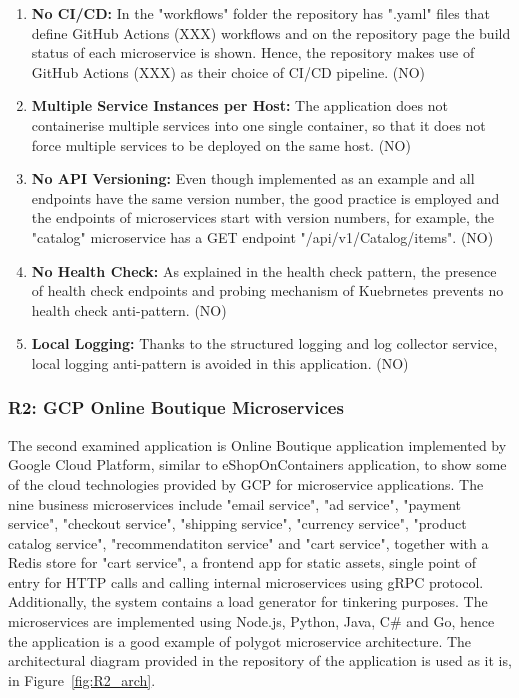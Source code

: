 \documentclass{Configuration_Files/PoliMi3i_thesis}
\begin{document}
\begin{enumerate}
    \item \textbf{No CI/CD:} In the "workflows" folder the repository has ".yaml" files that define GitHub Actions (XXX) workflows and on the repository page the build status of each microservice is shown.
    Hence, the repository makes use of GitHub Actions (XXX) as their choice of CI/CD pipeline. (NO)
    
    \item \textbf{Multiple Service Instances per Host:} The application does not containerise multiple services into one single container, so that it does not force multiple services to be deployed on the same host. (NO)
    
    \item \textbf{No API Versioning:} Even though implemented as an example and all endpoints have the same version number, the good practice is employed and the endpoints of microservices start with version numbers, for example, the "catalog" microservice has a GET endpoint "/api/v1/Catalog/items". (NO) 
    
    \item \textbf{No Health Check:} As explained in the health check pattern, the presence of health check endpoints and probing mechanism of Kuebrnetes prevents no health check anti-pattern. (NO)
    
    \item \textbf{Local Logging:} Thanks to the structured logging and log collector service, local logging anti-pattern is avoided in this application. (NO)
\end{enumerate}

\subsubsection{R2: GCP Online Boutique Microservices}
\label{subsubsec:R2}

The second examined application is Online Boutique application implemented by Google Cloud Platform, similar to eShopOnContainers application, to show some of the cloud technologies provided by GCP for microservice applications.
The nine business microservices include "email service", "ad service", "payment service", "checkout service", "shipping service", "currency service", "product catalog service", "recommendatiton service" and "cart service", together with a Redis store for "cart service", a frontend app for static assets, single point of entry for HTTP calls and calling internal microservices using gRPC protocol.
Additionally, the system contains a load generator for tinkering purposes.
The microservices are implemented using Node.js, Python, Java, C# and Go, hence the application is a good example of polygot microservice architecture.
The architectural diagram provided in the repository of the application is used as it is, in Figure~\ref{fig:R2_arch}.
\end{document}
